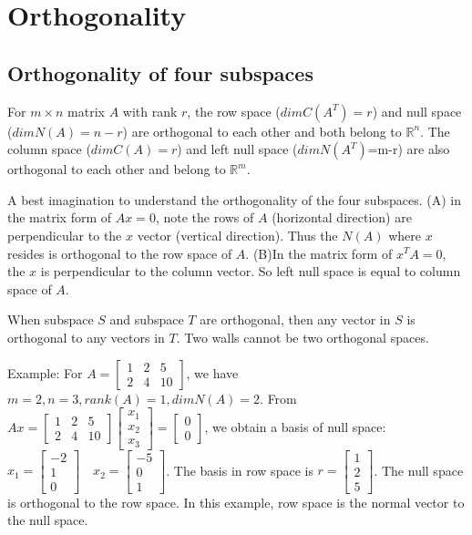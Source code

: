 \documentclass[11pt]{article}
\begin{document}
    \section{Orthogonality}\label{orthogonality}

\subsection{Orthogonality of four
subspaces}\label{orthogonality-of-four-subspaces}

For \(m \times n\) matrix \(A\) with rank \(r\), the row space
(\(dim C(A^T)=r\)) and null space (\(dim N(A)=n-r\)) are orthogonal to
each other and both belong to \(\mathbb{R}^n\). The column space
(\(dim C(A)=r\)) and left null space (\(dim N(A^T)\)=m-r) are also
orthogonal to each other and belong to \(\mathbb{R}^m\).

A best imagination to understand the orthogonality of the four
subspaces. (A) in the matrix form of \(Ax = 0\), note the rows of \(A\)
(horizontal direction) are perpendicular to the \(x\) vector (vertical
direction). Thus the \(N(A)\) where \(x\) resides is orthogonal to the
row space of \(A\). (B)In the matrix form of \(x^TA = 0\), the \(x\) is
perpendicular to the column vector. So left null space is equal to
column space of \(A\).

When subspace \(S\) and subspace \(T\) are orthogonal, then any vector
in \(S\) is orthogonal to any vectors in \(T\). Two walls cannot be two
orthogonal spaces.

Example: For \(A=\begin{bmatrix}1&2&5\\2&4&10\end{bmatrix}\), we have
\(m=2, n=3, rank(A)=1, dim N(A)=2\). From
\(Ax=\begin{bmatrix}1&2&5\\2&4&10\end{bmatrix}\begin{bmatrix}x_1\\x_2\\x_3\end{bmatrix}=\begin{bmatrix}0\\0\end{bmatrix}\),
we obtain a basis of null space:
\(x_1=\begin{bmatrix}-2\\1\\0\end{bmatrix}\quad x_2=\begin{bmatrix}-5\\0\\1\end{bmatrix}\).
The basis in row space is \(r=\begin{bmatrix}1\\2\\5\end{bmatrix}\). The
null space is orthogonal to the row space. In this example, row space is
the normal vector to the null space.
\end{document}
